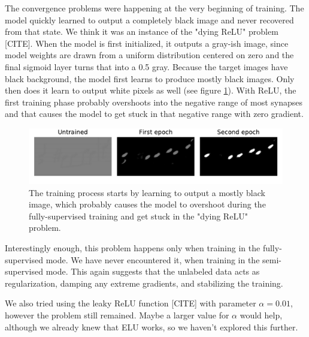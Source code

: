 The convergence problems were happening at the very beginning of training. The model quickly learned to output a completely black image and never recovered from that state. We think it was an instance of the "dying ReLU" problem [CITE]. When the model is first initialized, it outputs a gray-ish image, since model weights are drawn from a uniform distribution centered on zero and the final sigmoid layer turns that into a 0.5 gray. Because the target images have black background, the model first learns to produce mostly black images. Only then does it learn to output white pixels as well (see figure \ref{fig:ActivationTrainingProgression}). With ReLU, the first training phase probably overshoots into the negative range of most synapses and that causes the model to get stuck in that negative range with zero gradient.

\begin{figure}[ht]
    \centering
    \includegraphics[width=140mm]{../../figures/03-activation-function/progression.pdf}
    \caption{The training process starts by learning to output a mostly black image, which probably causes the model to overshoot during the fully-supervised training and get stuck in the "dying ReLU" problem.}
    \label{fig:ActivationTrainingProgression}
\end{figure}

Interestingly enough, this problem happens only when training in the fully-supervised mode. We have never encountered it, when training in the semi-supervised mode. This again suggests that the unlabeled data acts as regularization, damping any extreme gradients, and stabilizing the training.

We also tried using the leaky ReLU function [CITE] with parameter $\alpha = 0.01$, however the problem still remained. Maybe a larger value for $\alpha$ would help, although we already knew that ELU works, so we haven't explored this further.

